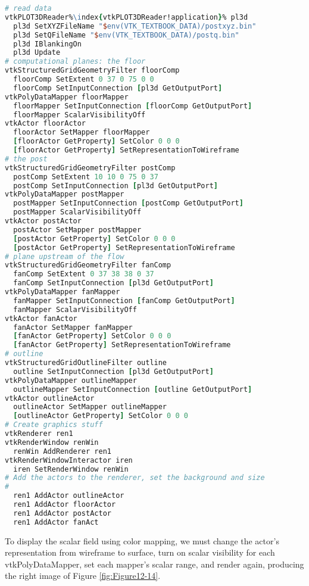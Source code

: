 \begin{lstlisting}[language=TCL, caption={Display the computational grid.}, escapechar=\%]
# read data
vtkPLOT3DReader%\index{vtkPLOT3DReader!application}% pl3d
  pl3d SetXYZFileName "$env(VTK_TEXTBOOK_DATA)/postxyz.bin"
  pl3d SetQFileName "$env(VTK_TEXTBOOK_DATA)/postq.bin"
  pl3d IBlankingOn
  pl3d Update
# computational planes: the floor
vtkStructuredGridGeometryFilter floorComp
  floorComp SetExtent 0 37 0 75 0 0
  floorComp SetInputConnection [pl3d GetOutputPort]
vtkPolyDataMapper floorMapper
  floorMapper SetInputConnection [floorComp GetOutputPort]
  floorMapper ScalarVisibilityOff
vtkActor floorActor
  floorActor SetMapper floorMapper
  [floorActor GetProperty] SetColor 0 0 0
  [floorActor GetProperty] SetRepresentationToWireframe
# the post
vtkStructuredGridGeometryFilter postComp
  postComp SetExtent 10 10 0 75 0 37
  postComp SetInputConnection [pl3d GetOutputPort]
vtkPolyDataMapper postMapper
  postMapper SetInputConnection [postComp GetOutputPort]
  postMapper ScalarVisibilityOff
vtkActor postActor
  postActor SetMapper postMapper
  [postActor GetProperty] SetColor 0 0 0
  [postActor GetProperty] SetRepresentationToWireframe
# plane upstream of the flow
vtkStructuredGridGeometryFilter fanComp
  fanComp SetExtent 0 37 38 38 0 37
  fanComp SetInputConnection [pl3d GetOutputPort]
vtkPolyDataMapper fanMapper
  fanMapper SetInputConnection [fanComp GetOutputPort]
  fanMapper ScalarVisibilityOff
vtkActor fanActor
  fanActor SetMapper fanMapper
  [fanActor GetProperty] SetColor 0 0 0
  [fanActor GetProperty] SetRepresentationToWireframe
# outline
vtkStructuredGridOutlineFilter outline
  outline SetInputConnection [pl3d GetOutputPort]
vtkPolyDataMapper outlineMapper
  outlineMapper SetInputConnection [outline GetOutputPort]
vtkActor outlineActor
  outlineActor SetMapper outlineMapper
  [outlineActor GetProperty] SetColor 0 0 0
# Create graphics stuff
vtkRenderer ren1
vtkRenderWindow renWin
  renWin AddRenderer ren1
vtkRenderWindowInteractor iren
  iren SetRenderWindow renWin
# Add the actors to the renderer, set the background and size
#
  ren1 AddActor outlineActor
  ren1 AddActor floorActor
  ren1 AddActor postActor
  ren1 AddActor fanAct
\end{lstlisting}

To display the scalar field using color mapping, we must change the actor's representation from wireframe to surface, turn on scalar visibility for each vtkPolyDataMapper, set each mapper's scalar range, and render again, producing the right image of Figure \ref{fig:Figure12-14}.

